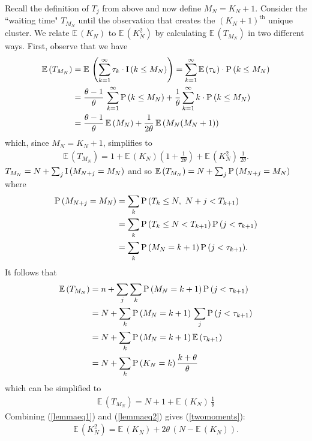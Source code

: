 \documentclass{article}
\begin{document}
Recall the definition of $T_j$ from above and now define $M_N = K_N +
1$.  Consider the ``waiting time" $T_{M_N}$ until the observation that
creates the $(K_N + 1)^{\textrm{th}}$ unique cluster.  We relate
$\mathbb{E}\,(K_N)$ to  $\mathbb{E}\,(K_N^2)$ by calculating
$\mathbb{E}\, (T_{M_N})$ in two different ways.  First, observe that
we have
\begin{align*}
\mathbb{E}\, (T_{M_N}) &= \mathbb{E}\,
\left(\sum\limits_{k=1}^\infty \tau_k \cdot {\rm I}\, (k \leq M_N)
\right) = \sum\limits_{k=1}^\infty \mathbb{E}\, (\tau_k) \cdot {\rm P}\,
(k \leq M_N) \\ &= \frac{\theta -1}{\theta}\,
\sum\limits_{k=1}^\infty {\rm P}\, (k \leq M_N) + \frac{1}{\theta}
\sum\limits_{k=1}^\infty k \cdot {\rm P}\, (k \leq M_N) \\ &=
\frac{\theta -1}{\theta}\, \mathbb{E}\, (M_N) + \frac{1}{2 \theta}\,
\mathbb{E}\, (M_N (M_N + 1))
\end{align*}
which, since $M_N = K_N + 1$, simplifies to 
\begin{align}
\mathbb{E}\, (T_{M_N})  = 1 + \mathbb{E}\, (K_N) \left( 1 + \frac{1}{2 \theta} \right) + \mathbb{E}\, (K_N^2)\, \frac{1}{2 \theta}.   \label{lemmaeq1}
\end{align}
$T_{M_N} = N + \sum_{j} {\rm I}\, (M_{N + j} = M_N)$ and so $\mathbb{E}\, (T_{M_N}) = N + \sum_{j} {\rm P}\, (M_{N + j} = M_N)$ where 
\begin{align*}
{\rm P}\,(M_{N + j} = M_N) &= \sum_k {\rm P}\,(T_k \leq N, \ N + j < T_{k + 1}) \\
&= \sum_k {\rm P}\,(T_k \leq N < T_{k + 1})\, {\rm P}\,(j < \tau_{k + 1}) \\
&= \sum_k {\rm P}\,(M_N = k + 1)\, {\rm P}\,(j < \tau_{k + 1}).
\end{align*}
It follows that
\begin{align*}
\mathbb{E}\,(T_{M_N}) &= n + \sum_j \sum_k {\rm P}\,(M_N = k + 1)\, {\rm P}\,(j < \tau_{k + 1}) \\
&= N + \sum_k {\rm P}\,(M_N = k + 1)\,  \sum_j {\rm P}\,(j < \tau_{k + 1}) \\
&= N + \sum_k {\rm P}\,(M_N = k + 1)\, \mathbb{E}\,(\tau_{k + 1}) \\
&= N + \sum_k {\rm P}\,(K_N = k)\, \frac{k+\theta}{\theta} \\
\end{align*}
which can be simplified to 
\begin{align}
\mathbb{E}\,(T_{M_N})  = N + 1 + \mathbb{E}\,(K_N)\, \frac{1}{\theta}   \label{lemmaeq2}
\end{align}
Combining (\ref{lemmaeq1}) and (\ref{lemmaeq2}) gives (\ref{twomoments}): 
\begin{align*}
\mathbb{E}\,(K_N^2) = \mathbb{E}\,(K_N) + 2\theta\,(N - \mathbb{E}\,(K_N)). 
\end{align*}
\end{document}
